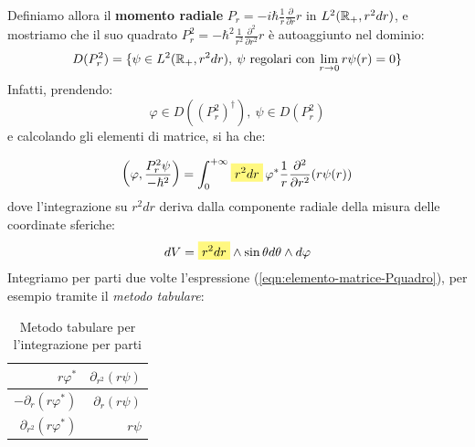 \documentclass[../../FisicaTeorica.tex]{subfiles}
\begin{document}
Definiamo allora il \textbf{momento radiale} $P_r = -i\hbar \frac{1}{r}\frac{\partial}{\partial r} r$ in $L^2(\mathbb{R}_+, r^2 dr)$, e mostriamo che il suo quadrato $P_r^2 = -\hbar^2 \frac{1}{r^2} \frac{\partial^2}{\partial r^2} r$ è autoaggiunto nel dominio:
\[
D(P_r^2) = \{
\psi \in L^2(\mathbb{R}_+, r^2 dr),\>\text{$\psi$ regolari con $\lim_{r\to 0} r\psi(r)=0$}
\}
\]
Infatti, prendendo:
\[
\varphi \in D((P^2_r)^\dag), \> \psi \in D(P_r^2)
\]
e calcolando gli elementi di matrice, si ha che:

\begin{align}
\left(\varphi, \frac{P_r^2 \psi}{-\hbar^2}\right) = \int_0^{+\infty} \hlc{Yellow}{r^2 dr}\, \varphi^* \frac{1}{r} \frac{\partial^2}{\partial r^2} (r\psi(r))
\label{eqn:elemento-matrice-Pquadro}
\end{align}
dove l'integrazione su $r^2 dr$ deriva dalla componente radiale della misura delle coordinate sferiche:
\begin{align*}
dV =\hlc{Yellow}{r^2 dr} \land \sin\theta d\theta \land d\varphi
\end{align*}
Integriamo per parti due volte l'espressione (\ref{eqn:elemento-matrice-Pquadro}), per esempio tramite il \textit{metodo tabulare}:
\begin{table}[H]
\centering
\begin{tabular}{@{}rr@{}}
\toprule
$r\varphi^*$ & $\partial_{r^2}(r\psi)$\\ \midrule
$-\partial_r (r\varphi^*)$ & $\partial_r (r\psi)$\\
$\partial_{r^2}(r\varphi^*)$ & $r\psi$\\
\bottomrule
\end{tabular}
\caption{Metodo tabulare per l'integrazione per parti}
\end{table}
\end{document}
